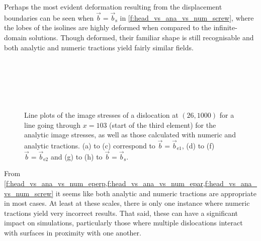 Perhaps the most evident deformation resulting from the displacement boundaries can be seen when $\vec{b} = \vec{b}_{\textrm{s}}$ in \cref{f:head_vs_ana_vs_num_screw}, where the lobes of the isolines are highly deformed when compared to the infinite-domain solutions. Though deformed, their familiar shape is still recognisable and both analytic and numeric tractions yield fairly similar fields.

\begin{figure}
  \centering
  ~
  ~

  ~
  ~

  ~
  \caption[Line plots of the infinite domain, analytic and traction image stresses.]{Line plots of the image stresses of a dislocation at $(26, 1000)$ for a line going through $x = 103$ (start of the third element) for the analytic image stresses, as well as those calculated with numeric and analytic tractions. (a) to (c) correspond to $\vec{b} = \vec{b}_{\textrm{e1}}$, (d) to (f) $\vec{b} = \vec{b}_{\textrm{e2}}$ and (g) to (h) to $\vec{b} = \vec{b}_{\textrm{s}}$.}
  \label{f:line_head_vs_ana_vs_num}
\end{figure}
From \cref{f:head_vs_ana_vs_num_eperp,f:head_vs_ana_vs_num_epar,f:head_vs_ana_vs_num_screw} it seems like both analytic and numeric tractions are appropriate in most cases. At least at these scales, there is only one instance where numeric tractions yield very incorrect results. That said, these can have a significant impact on simulations, particularly those where multiple dislocations interact with surfaces in proximity with one another.

